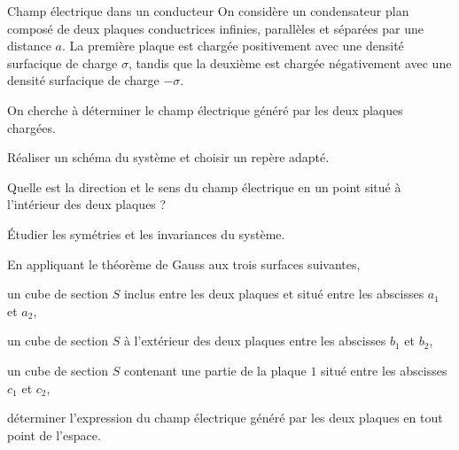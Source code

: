 \begin{td}{Champ électrique dans un conducteur}
On considère un condensateur plan composé de deux plaques conductrices infinies,
parallèles et séparées par une distance $a$. La
première plaque est chargée positivement avec une densité surfacique de charge
$\sigma$, tandis que la deuxième est chargée négativement avec une densité 
surfacique de charge $-\sigma$.

On cherche à déterminer le champ électrique généré par les deux plaques chargées.

\begin{exlist}
	\item Réaliser un schéma du système et choisir un repère adapté.
	\item Quelle est la direction et le sens du champ électrique en un point
	  situé à l'intérieur des deux plaques ?
	\item Étudier les symétries et les invariances du système. 
	\item En appliquant le théorème de Gauss aux trois surfaces suivantes,
	  	  	\begin{exlist}
			\item un cube de section $S$ inclus entre les deux plaques 
			  et situé entre les abscisses $a_1$ et $a_2$,
			\item un cube de section $S$ à l'extérieur des deux plaques
			  entre les abscisses $b_1$ et $b_2$,
			\item un cube de section $S$ contenant une partie 
			  de la plaque $1$ situé entre les abscisses $c_1$ et
			  $c_2$,

		\end{exlist}
	déterminer l'expression du champ électrique généré par les deux plaques
	en tout point de l'espace.
\end{exlist}
\end{td}


